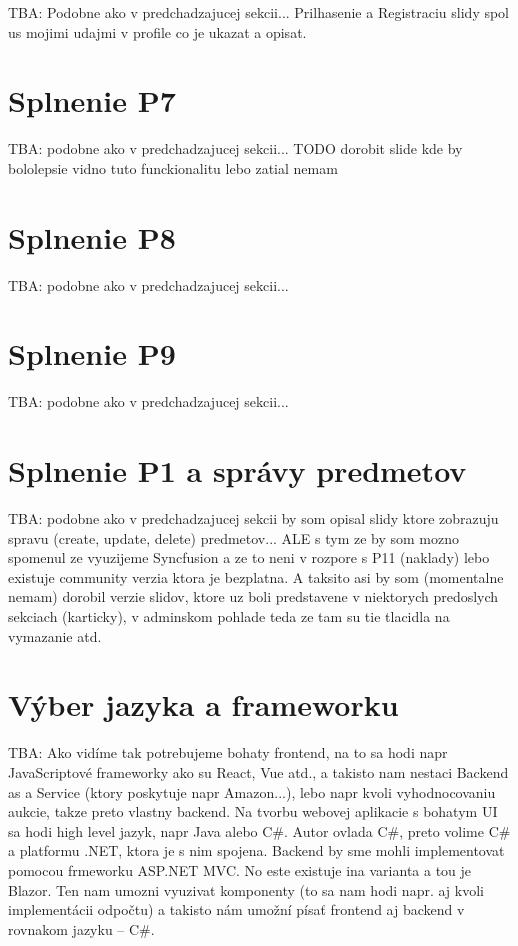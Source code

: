 TBA: Podobne ako v predchadzajucej sekcii... Prilhasenie a Registraciu slidy spol us mojimi udajmi v profile co je ukazat a opisat.

\section{Splnenie P7}

TBA: podobne ako v predchadzajucej sekcii... TODO dorobit slide kde by bololepsie vidno tuto funckionalitu lebo zatial nemam

\section{Splnenie P8}

TBA: podobne ako v predchadzajucej sekcii...

\section{Splnenie P9}

TBA: podobne ako v predchadzajucej sekcii...

\section{Splnenie P1 a správy predmetov}

TBA: podobne ako v predchadzajucej sekcii by som opisal slidy ktore zobrazuju spravu (create, update, delete) predmetov... ALE s tym ze by som mozno spomenul ze vyuzijeme Syncfusion a ze to neni v rozpore s P11 (naklady) lebo existuje community verzia ktora je bezplatna. A taksito asi by som (momentalne nemam) dorobil verzie slidov, ktore uz boli predstavene v niektorych predoslych sekciach (karticky), v adminskom pohlade teda ze tam su tie tlacidla na vymazanie atd.

\section{Výber jazyka a frameworku}

TBA: Ako vidíme tak potrebujeme bohaty frontend, na to sa hodi napr JavaScriptové frameworky ako su React, Vue atd., a takisto nam nestaci Backend as a Service (ktory poskytuje napr Amazon...), lebo napr kvoli vyhodnocovaniu aukcie, takze preto vlastny backend. Na tvorbu webovej aplikacie s bohatym UI sa hodi high level jazyk, napr Java alebo C\#. Autor ovlada C\#, preto volime C\# a platformu .NET, ktora je s nim spojena. Backend by sme mohli implementovat pomocou frmeworku ASP.NET MVC. No este existuje ina varianta a tou je Blazor. Ten nam umozni vyuzivat komponenty (to sa nam hodi napr. aj kvoli implementácii odpočtu) a takisto nám umožní písať frontend aj backend v rovnakom jazyku -- C\#.

